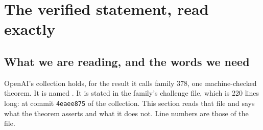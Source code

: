 \section{The verified statement, read exactly}
\label{sec:statement}
\begingroup\sloppy

\subsection{What we are reading, and the words we need}
\label{sec:statement-words}

OpenAI's collection \citep{OAI:The-Exponential-Time-Hypothesis-is-False-October-25-2026}
holds, for the result it calls family 378, one machine-checked theorem.
It is named . It is stated in the family's
challenge file, which is 220 lines long:
 at commit
\texttt{4eaee875} of the collection. This section reads that
file and says what the theorem asserts and what it does not. Line
numbers are those of the file.

